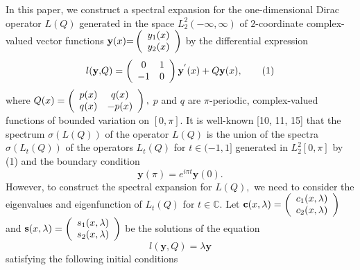 \documentclass{article}%
\begin{document}
In this paper, we construct a spectral expansion for the one-dimensional Dirac
operator $L(Q)$ generated in the space $L_{2}^{2}(-\infty,\infty)$ of
$2$-coordinate complex-valued vector functions $\mathbf{y}(x)\mathbf{=}\left(
%
\begin{array}
[c]{c}%
y_{1}(x)\\
y_{2}(x)
\end{array}
\right)  $ by the differential expression
\begin{equation}
l(\mathbf{y,}Q)=\left(
\begin{array}
[c]{cc}%
0 & 1\\
-1 & 0
\end{array}
\right)  \mathbf{y}^{^{\prime}}(x)+Q\mathbf{y}(x), \tag{1}%
\end{equation}
where $Q(x)=\left(
\begin{array}
[c]{cc}%
p(x) & q(x)\\
q(x) & -p(x)
\end{array}
\right)  ,$ $p$ and $q$ are $\pi$-periodic, complex-valued functions of
bounded variation on $[0,\pi]$. It is well-known [10, 11, 15] that the
spectrum $\sigma(L(Q))$ of the operator $L(Q)$ is the union of the spectra
$\sigma(L_{t}(Q))$ of the operators $L_{t}(Q)$ for $t\in(-1,1]$ generated in
$L_{2}^{2}[0,\pi]$ by (1) and the boundary condition
\begin{equation}
\mathbf{y}(\pi)=e^{i\pi t}\mathbf{y}(0). \tag{2}%
\end{equation}
However, to construct the spectral expansion for $L(Q),$ we need to consider
the eigenvalues and eigenfunction of $L_{t}(Q)$ for $t\in\mathbb{C}.$ Let
$\mathbf{c}(x,\lambda)=\left(
\begin{array}
[c]{c}%
c_{1}(x,\lambda)\\
c_{2}(x,\lambda)
\end{array}
\right)  $ and $\mathbf{s}(x,\lambda)=\left(
\begin{array}
[c]{c}%
s_{1}(x,\lambda)\\
s_{2}(x,\lambda)
\end{array}
\right)  $ be the solutions of the equation%
\begin{equation}
l(\mathbf{y,}Q)=\lambda\mathbf{y} \tag{3}%
\end{equation}
satisfying the following initial conditions%
\end{document}
